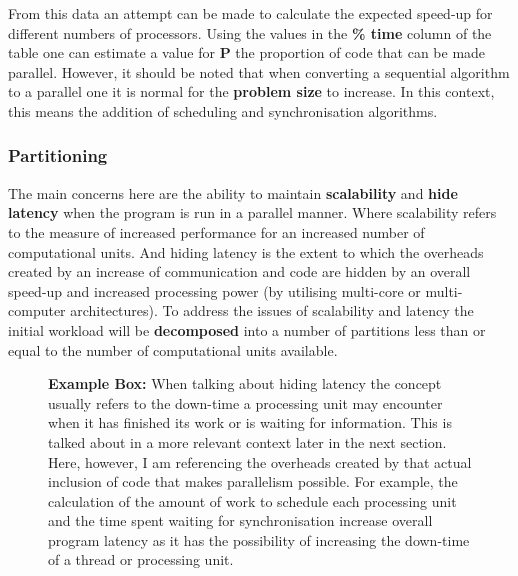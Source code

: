 \documentclass[11pt]{article} %
\begin{document}
From this data an attempt can be made to calculate the expected speed-up for different numbers of processors. Using the values in the {\bf \% time} column of the table one can estimate a value for {\bf P} the proportion of code that can be made parallel. However, it should be noted that when converting a sequential algorithm to a parallel one it is normal for the {\bf problem size} to increase. In this context, this means the addition of scheduling and synchronisation algorithms.
\subsubsection*{Partitioning}
The main concerns here are the ability to maintain {\bf scalability} and {\bf hide latency} when the program is run in a parallel manner. Where scalability refers to the measure of increased performance for an increased number of computational units. And hiding latency is the extent to which the overheads created by an increase of communication and code are hidden by an overall speed-up and increased processing power (by utilising multi-core or multi-computer architectures). \cite[p78,79]{ref9} To address the issues of scalability and latency the initial workload will be {\bf decomposed} into a number of partitions less than or equal to the number of computational units available.\\
\begin{figure}
\begin{mdframed}
{\bf Example Box:} When talking about hiding latency the concept usually refers to the down-time a processing unit may encounter when it has finished its work or is waiting for information. This is talked about in a more relevant context later in the next section. Here, however, I am referencing the overheads created by that actual inclusion of code that makes parallelism possible. For example, the calculation of the amount of work to schedule each processing unit and the time spent waiting for synchronisation increase overall program latency as it has the possibility of increasing the down-time of a thread or processing unit.
\end{mdframed}
\end{figure}
\end{document}
